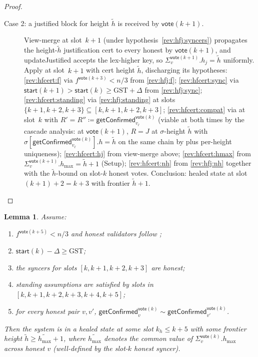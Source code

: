 \ifx\litemode\undefined\documentclass{article}\fi
\newcommand{\hmax}{\ensuremath{h_{\max}}\xspace}
\newcommand{\start}{\ensuremath{\mathsf{start}}}
\newcommand{\vote}{\ensuremath{\mathsf{vote}}}
\newcommand{\GST}{\ensuremath{\mathrm{GST}}\xspace}
\newcommand{\comm}[1]{\ensuremath{\widetilde{#1}}}
\newcommand{\updateJustified}{\textsf{updateJustified}\xspace}
\newcommand{\getConfirmed}{\textsf{getConfirmed}\xspace}
\theoremstyle{plain}
\newtheorem{lemma}{Lemma}
\theoremstyle{definition}
\theoremstyle{remark}
\begin{document}
\begin{proof}
\begin{description}
  \item[Case 2: a justified block for height $\comm{h}$ is received by $\vote(k+1)$.]
  View-merge at slot~$k+1$ (under hypothesis~\ref{rev:hfj:syncers}) propagates the height-$\comm{h}$ justification cert to every honest by $\vote(k+1)$, and \updateJustified{} accepts the lex-higher key, so $\Sigma_v^{\vote(k+1)}.h_j = \comm{h}$ uniformly.
  Apply  at slot~$k+1$ with cert height $\comm{h}$, discharging its hypotheses:
  \ref{rev:hfcert:f} via $f^{\vote(k+3)} < n/3$ from \ref{rev:hfj:f};
  \ref{rev:hfcert:sync} via $\start(k+1) > \start(k) \geq \GST + \Delta$ from \ref{rev:hfj:sync};
  \ref{rev:hfcert:standing} via \ref{rev:hfj:standing} at slots $\{k+1, k+2, k+3\} \subseteq [k,k+1,k+2,k+3]$;
  \ref{rev:hfcert:compat} via  at slot~$k$ with $R' = R'' \coloneqq \getConfirmed_{v_\ell}^{\vote(k)}$ (viable at both times by the cascade analysis: at $\vote(k+1)$, $R = J$ at $\sigma$-height $\comm{h}$ with $\sigma[\getConfirmed_{v_\ell}^{\vote(k)}].h = \comm{h}$ on the same chain by  plus per-height uniqueness);
  \ref{rev:hfcert:hj} from view-merge above;
  \ref{rev:hfcert:hmax} from $\Sigma_v^{\vote(k+1)}.\hmax = \comm{h}+1$ (Setup);
  \ref{rev:hfcert:nh} from \ref{rev:hfj:nh} together with the $\comm{h}$-bound on slot-$k$ honest votes.
  Conclusion: healed state at slot $(k+1)+2 = k+3$ with frontier $\comm{h}+1$.
\end{description}
\end{proof}

\begin{lemma}\label{lem:healing-from-compat}
Assume:
\begin{enumerate}
  \item\label{rev:hfc:f} $f^{\vote(k+5)} < n/3$ and honest validators follow ;
  \item\label{rev:hfc:sync} $\start(k) - \Delta \geq \GST$;
  \item\label{rev:hfc:syncers} the syncers for slots $[k,k+1,k+2,k+3]$ are honest;
  \item\label{rev:hfc:standing} standing assumptions are satisfied by slots in $[k,k+1,k+2,k+3,k+4,k+5]$;
  \item\label{rev:hfc:compat} for every honest pair $v, v'$, $\getConfirmed_v^{\vote(k)} \sim \getConfirmed_{v'}^{\vote(k)}$.
\end{enumerate}
Then the system is in a healed state at some slot $k_h \leq k+5$ with some frontier height $\comm{h} \geq \comm{\hmax}+1$, where $\comm{\hmax}$ denotes the common value of $\Sigma_v^{\vote(k)}.\hmax$ across honest $v$ (well-defined by the slot-$k$ honest syncer).
\end{lemma}
\end{document}
